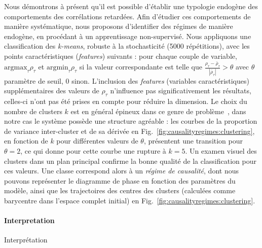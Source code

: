 {Nous démontrons à présent qu'il est possible d'établir une typologie endogène des comportements des corrélations retardées. Afin d'étudier ces comportements de manière systématique, nous proposons d'identifier des régimes de manière endogène, en procédant à un apprentissage non-supervisé. Nous appliquons une classification des \emph{k-means}, robuste à la stochasticité (5000 répétitions), avec les points caractéristiques (\emph{features}) suivants : pour chaque couple de variable, $\textrm{argmax}_{\tau} \rho_{\tau}$ et $\textrm{argmin}_{\tau} \rho_{\tau}$ si la valeur correspondante est telle que $\frac{\rho_{\tau}-\bar{\rho}_{\tau}}{\left|\bar{\rho}_{\tau}\right|} > \theta$ avec $\theta$ paramètre de seuil, 0 sinon. L'inclusion des \emph{features} (variables caractéristiques) supplémentaires des valeurs de $\rho_{\tau}$ n'influence pas significativement les résultats, celles-ci n'ont pas été prises en compte pour réduire la dimension. Le choix du nombre de clusters $k$ est en général épineux dans ce genre de problème~\cite{hamerly2003learning}, dans notre cas le système possède une structure agréable : les courbes de la proportion de variance inter-cluster et de sa dérivée en Fig.~\ref{fig:causalityregimes:clustering}, en fonction de $k$ pour différentes valeurs de $\theta$, présentent une transition pour $\theta = 2$, ce qui donne pour cette courbe une rupture à $k=5$. Un examen visuel des clusters dans un plan principal confirme la bonne qualité de la classification pour ces valeurs. Une classe correspond alors à un \emph{régime de causalité}, dont nous pouvons représenter le diagramme de phase en fonction des paramètres du modèle, ainsi que les trajectoires des centres des clusters (calculées comme barycentre dans l'espace complet initial) en Fig.~\ref{fig:causalityregimes:clustering}.
}



\paragraph{Interpretation}{Interprétation}

